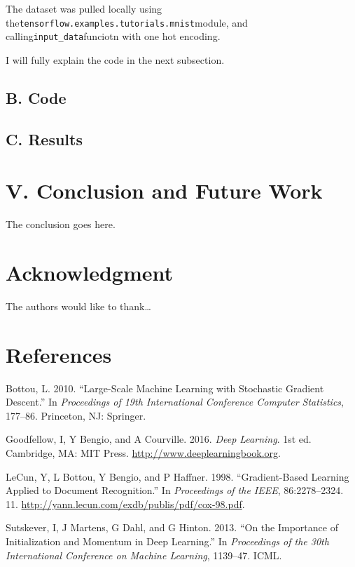 \documentclass[conference,final,]{IEEEtran}
\begin{document}
The dataset was pulled locally using
the\texttt{tensorflow.examples.tutorials.mnist}module, and
calling\texttt{input\_data}funciotn with one hot encoding.

I will fully explain the code in the next subsection.

\subsection{B. Code}\label{b.-code}

\subsection{C. Results}\label{c.-results}

\section{V. Conclusion and Future
Work}\label{v.-conclusion-and-future-work}

The conclusion goes here.

\section{Acknowledgment}\label{acknowledgment}

The authors would like to thank\ldots{}

\newpage

\section*{References}\label{references}

\hypertarget{refs}{}
\hypertarget{ref-sgd2010}{}
Bottou, L. 2010. ``Large-Scale Machine Learning with Stochastic Gradient
Descent.'' In \emph{Proceedings of 19th International Conference
Computer Statistics}, 177--86. Princeton, NJ: Springer.

\hypertarget{ref-goodfellow2016}{}
Goodfellow, I, Y Bengio, and A Courville. 2016. \emph{Deep Learning}.
1st ed. Cambridge, MA: MIT Press. \url{http://www.deeplearningbook.org}.

\hypertarget{ref-lecun1998}{}
LeCun, Y, L Bottou, Y Bengio, and P Haffner. 1998. ``Gradient-Based
Learning Applied to Document Recognition.'' In \emph{Proceedings of the
IEEE}, 86:2278--2324. 11.
\url{http://yann.lecun.com/exdb/publis/pdf/cox-98.pdf}.

\hypertarget{ref-sgd2013}{}
Sutskever, I, J Martens, G Dahl, and G Hinton. 2013. ``On the Importance
of Initialization and Momentum in Deep Learning.'' In \emph{Proceedings
of the 30th International Conference on Machine Learning}, 1139--47.
ICML.
\end{document}

